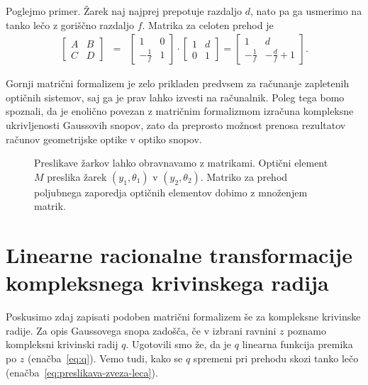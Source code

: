 Poglejmo primer. Žarek naj najprej prepotuje razdaljo $d$, nato pa ga usmerimo
na tanko lečo z goriščno razdaljo $f$. Matrika za celoten prehod je
\begin{eqnarray}
\left[\begin{array}{cc}
A & B\\
C & D
\end{array}\right] & = & \left[\begin{array}{cc}
1 & 0\\
-\frac{1}{f} & 1
\end{array}\right]\cdot\left[\begin{array}{cc}
1 & d\\
0 & 1
\end{array}\right] =  \left[\begin{array}{cc}
1 & d\\
-\frac{1}{f} & -\frac{d}{f}+1
\end{array}\right].
\label{eq:Mdf}
\end{eqnarray}

Gornji matrični formalizem je zelo prikladen predvsem za računanje zapletenih
optičnih sistemov, saj ga je prav lahko izvesti na računalnik. Poleg
tega bomo spoznali, da je enolično povezan z matričnim formalizmom izračuna
kompleksne ukrivljenosti Gaussovih snopov, zato da preprosto možnost
prenosa rezultatov računov geometrijske optike v optiko
snopov.

\begin{figure}[h]
\centering
\centering
\def\svgwidth{100truemm}

\caption{Preslikave žarkov lahko obravnavamo
z matrikami. Optični element $M$ preslika žarek $(y_{1},\theta_{1})$
v $(y_{2},\theta_{2})$. Matriko za prehod poljubnega zaporedja optičnih
 elementov dobimo z množenjem matrik.}
\label{fig:K-matricni-obravnavi}
\end{figure}

\section{Linearne racionalne transformacije kompleksnega krivinskega radija}

Poskusimo zdaj zapisati podoben matrični formalizem še za kompleksne krivinske
radije. Za opis Gaussovega snopa zadošča, če v izbrani ravnini $z$ poznamo kompleksni
krivinski radij $q$. Ugotovili smo že, da je $q$ linearna funkcija
premika po $z$ (enačba~\ref{eq:q}). Vemo tudi, kako se $q$ spremeni pri prehodu skozi tanko
lečo (enačba~\ref{eq:preslikava-zveza-leca}). 

